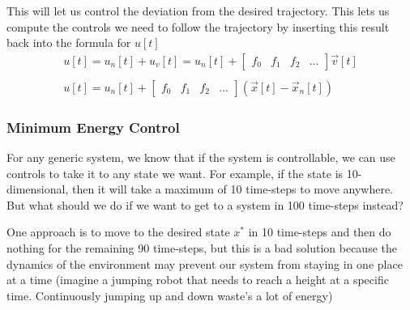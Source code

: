 \documentclass{article}
\begin{document}
This will let us control the deviation from the desired trajectory.
This lets us compute the controls we need to follow the trajectory by inserting this result back into the formula for $u[t]$
\[
    \begin{array}{c}
        u[t] = u_n[t]+u_v[t] = u_n[t]+\left[
            \begin{array}{cccc}
                f_0 & f_1 & f_2 & ...
            \end{array}
        \right] \vec{v}[t] \\\\
        u[t] = u_n[t]+\left[
            \begin{array}{cccc}
                f_0 & f_1 & f_2 & ...
            \end{array}
        \right] (\vec{x}[t]-\vec{x}_n[t])
    \end{array}
\]

\subsubsection{Minimum Energy Control}
For any generic system, we know that if the system is controllable, we can use controls to take it to any state we want.
For example, if the state is 10-dimensional, then it will take a maximum of 10 time-steps to move anywhere.
But what should we do if we want to get to a system in 100 time-steps instead?

One approach is to move to the desired state $x^*$ in 10 time-steps and then do nothing for the remaining 90 time-steps,
 but this is a bad solution because the dynamics of the environment may prevent our system from staying in one place at a time (imagine a jumping robot that needs to reach a height at a specific time. Continuously jumping up and down waste's a lot of energy)
\end{document}
